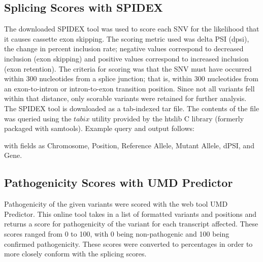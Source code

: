 \documentclass[12pt]{article}
\begin{document}
\subsection{Splicing Scores with SPIDEX}
The downloaded SPIDEX tool was used to score each SNV for the likelihood that
it causes cassette exon skipping. The scoring metric used was delta PSI (dpsi),
the change in percent inclusion rate; negative values correspond to decreased
inclusion (exon skipping) and positive values correspond to increased inclusion 
(exon retention). The criteria for scoring was that the SNV must have occurred
within 300 nucleotides from a splice junction; that is, within 300 
nucleotides from an exon-to-intron or intron-to-exon transition position. Since
not all variants fell within that distance, only scorable variants were 
retained for further analysis.
\\[\baselineskip]
The SPIDEX tool is downloaded as a tab-indexed tar file. The contents of the
file was queried using the $tabix$ utility provided by the htslib C library 
(formerly packaged with samtools). Example query and output follows:



with fields as Chromosome, Position, Reference Allele, Mutant Allele, dPSI, 
and Gene.

\subsection{Pathogenicity Scores with UMD Predictor}
Pathogenicity of the given variants were scored with the web tool UMD 
Predictor. This online tool takes in a list of formatted variants and positions
and returns a score for pathogenicity of the variant for each transcript 
affected. These scores ranged from 0 to 100, with 0 being non-pathogenic and
100 being confirmed pathogenicity. These scores were converted to percentages
in order to more closely conform with the splicing scores.
\end{document}

